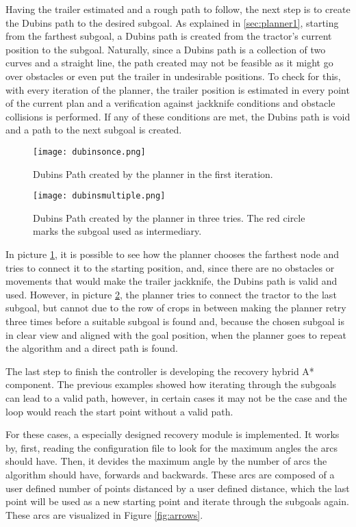 Having the trailer estimated and a rough path to follow, the next step is to create the 
Dubins path to the desired subgoal. As explained in \ref{sec:planner1}, starting from the farthest subgoal, 
a Dubins path is created from the tractor's current position to the subgoal. Naturally, since a Dubins 
path is a collection of two curves and a straight line, the path created may not be feasible as it might 
go over obstacles or even put the trailer in undesirable positions. To check for this, with every iteration 
of the planner, the trailer position is estimated in every point of the current plan and a verification 
against jackknife conditions and obstacle collisions is performed. If any of these conditions 
are met, the Dubins path is void and a path to the next subgoal is created.

\begin{figure}[h]
    \centering
    \texttt{[image: dubinsonce.png]}
    \caption{Dubins Path created by the planner in the first iteration.}
    \label{fig:dubins_path1}
\end{figure}
\begin{figure}[h]
    \centering
    \texttt{[image: dubinsmultiple.png]}
    \caption{Dubins Path created by the planner in three tries. The red circle marks the subgoal used as intermediary.}
    \label{fig:dubins_path2}
\end{figure}

In picture \ref{fig:dubins_path1}, it is possible to see how the planner chooses the farthest node and tries 
to connect it to the starting position, and, since there are no obstacles or movements that would make 
the trailer jackknife, the Dubins path is valid and used. However, in picture \ref{fig:dubins_path2}, the 
planner tries to connect the tractor to the last subgoal, but cannot due to the row of crops in between 
making the planner retry three times before a suitable subgoal is found and, because the chosen subgoal 
is in clear view and aligned with the goal position, when the planner goes to repeat the algorithm 
and a direct path is found.

The last step to finish the controller is developing the recovery hybrid A* component. The previous 
examples showed how iterating through the subgoals can lead to a valid path, however, in certain cases 
it may not be the case and the loop would reach the start point without a valid path.

For these cases, a especially designed recovery module is implemented. It works by, first, reading the 
configuration file to look for the maximum angles the arcs should have. Then, it devides the maximum 
angle by the number of arcs the algorithm should have, forwards and backwards. These arcs are composed 
of a user defined number of points distanced by a user defined distance, which the last point will be 
used as a new starting point and iterate through the subgoals again. These arcs are visualized in Figure \ref{fig:arrows}.

